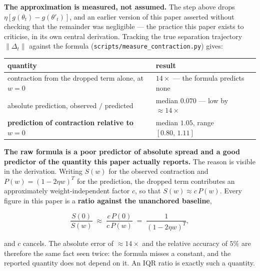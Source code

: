 \textbf{The approximation is measured, not assumed.} The step above drops
\(\eta[g(\theta_t) - g(\theta'_t)]\), and an earlier version of this paper asserted without
checking that the remainder was negligible --- the practice this paper exists to criticise, in its
own central derivation. Tracking the true separation trajectory
\(\lVert \Delta_t \rVert\) against the formula (\texttt{scripts/measure\_contraction.py}) gives:

{\def\LTcaptype{none} %
\begin{longtable}[]{@{}
  >{\raggedright\arraybackslash}p{}
  >{\raggedright\arraybackslash}p{}@{}}
\toprule\noalign{}
\begin{minipage}[b]{\linewidth}\raggedright
quantity
\end{minipage} & \begin{minipage}[b]{\linewidth}\raggedright
result
\end{minipage} \\
\midrule\noalign{}
\endhead
\bottomrule\noalign{}
\endlastfoot
contraction from the dropped term alone, at \(w = 0\) & \(14\times\) --- the formula predicts none \\
absolute prediction, observed \(/\) predicted & median \(0.070\) --- low by \(\approx 14\times\) \\
\textbf{prediction of contraction relative to \(w = 0\)} & median \(1.05\), range \([0.80,\, 1.11]\) \\
\end{longtable}
}

\textbf{The raw formula is a poor predictor of absolute spread and a good predictor of the quantity
this paper actually reports.} The reason is visible in the derivation. Writing \(S(w)\) for the
observed contraction and \(P(w) = (1-2\eta w)^T\) for the prediction, the dropped term contributes
an approximately weight-independent factor \(c\), so that \(S(w) \approx c\,P(w)\). Every figure in
this paper is a \textbf{ratio against the unanchored baseline},

\[\frac{S(0)}{S(w)} \;\approx\; \frac{c\,P(0)}{c\,P(w)} \;=\; \frac{1}{(1-2\eta w)^T},\]

and \(c\) cancels. The absolute error of \(\approx 14\times\) and the relative accuracy of \(5\%\) are
therefore the same fact seen twice: the formula misses a constant, and the reported quantity does
not depend on it. An IQR ratio is exactly such a quantity.

